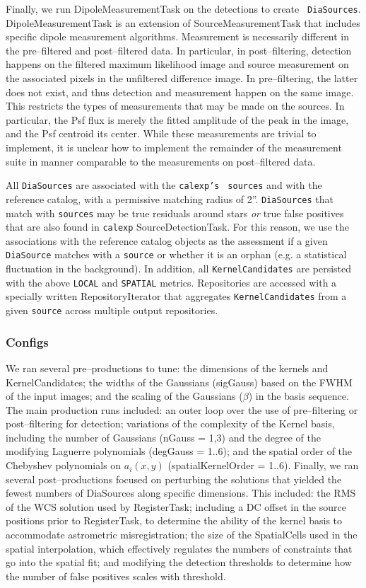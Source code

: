 \documentclass[prd, nofootinbib, floatfix, 11pt,tightenlines,times]{article}
\begin{document}
Finally, we run DipoleMeasurementTask on the detections to create {\tt
  DiaSources}.  DipoleMeasurementTask is an extension of
SourceMeasurementTask that includes specific dipole measurement
algorithms.  Measurement is necessarily different in the pre--filtered
and post--filtered data.  In particular, in post--filtering, detection
happens on the filtered maximum likelihood image and source
measurement on the associated pixels in the unfiltered difference
image.  In pre--filtering, the latter does not exist, and thus
detection and measurement happen on the same image.  This restricts
the types of measurements that may be made on the sources.  In
particular, the Psf flux is merely the fitted amplitude of the peak in
the image, and the Psf centroid its center.  While these measurements
are trivial to implement, it is unclear how to implement the remainder
of the measurement suite in manner comparable to the measurements on
post--filtered data.

All {\tt DiaSources} are associated with the {\tt calexp's} {\tt
  sources} and with the reference catalog, with a permissive matching
radius of 2''.  {\tt DiaSources} that match with {\tt sources} may be
true residuals around stars {\it or} true false positives that are
also found in {\tt calexp} SourceDetectionTask.  For this reason, we
use the associations with the reference catalog objects as the
assessment if a given {\tt DiaSource} matches with a {\tt source} or
whether it is an orphan (e.g. a statistical fluctuation in the
background).  In addition, all {\tt KernelCandidates} are persisted
with the above {\tt LOCAL} and {\tt SPATIAL} metrics.  Repositories
are accessed with a specially written RepositoryIterator that
aggregates {\tt KernelCandidates} from a given {\tt source} across
multiple output repositories.

\subsubsection{Configs}

We ran several pre--productions to tune: the dimensions of the kernels
and KernelCandidates; the widths of the Gaussians (sigGauss) based on
the FWHM of the input images; and the scaling of the Gaussians
($\beta$) in the basis sequence.  The main production runs included:
an outer loop over the use of pre--filtering or post--filtering for
detection; variations of the complexity of the Kernel basis, including
the number of Gaussians (nGauss = 1,3) and the degree of the modifying
Laguerre polynomials (degGauss = 1..6); and the spatial order of the
Chebyshev polynomials on $a_i(x,y)$ (spatialKernelOrder = 1..6).
Finally, we ran several post--productions focused on perturbing the
solutions that yielded the fewest numbers of DiaSources along specific
dimensions.  This included: the RMS of the WCS solution used by
RegisterTask; including a DC offset in the source positions prior to
RegisterTask, to determine the ability of the kernel basis to
accommodate astrometric misregistration; the size of the SpatialCells
used in the spatial interpolation, which effectively regulates the
numbers of constraints that go into the spatial fit; and modifying the
detection thresholds to determine how the number of false positives
scales with threshold.
\end{document}
